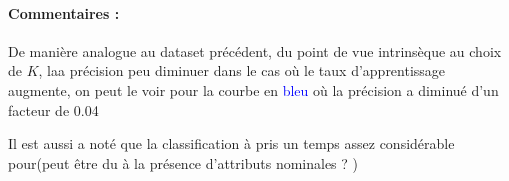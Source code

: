 		\paragraph{Commentaires : }
		De manière analogue au dataset précédent, du point de vue intrinsèque au choix de $K$, laa précision peu diminuer dans le cas où le taux d'apprentissage augmente, on peut le voir pour la courbe en \textcolor{blue}{bleu} où la précision a diminué d'un facteur de 0.04
		\par Il est aussi a noté que la classification à pris un temps assez considérable pour(peut être du à la présence d'attributs nominales ? )
	